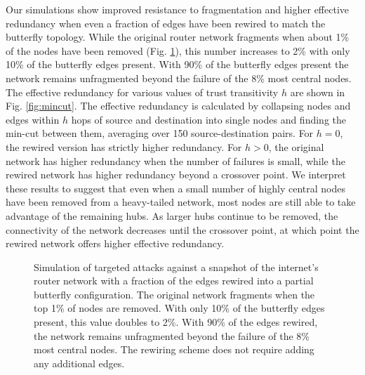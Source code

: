 \documentclass[10pt,letterpaper]{article}
\begin{document}
Our simulations show improved resistance to fragmentation and higher
effective redundancy when even a fraction of edges have been rewired to
match the butterfly topology.
While the original router network fragments when about 1\% of the nodes
have been removed (Fig. \ref{fig:diameter}),
this number increases to 2\%
with only 10\% of the butterfly edges present.
With 90\% of the butterfly edges present
the network remains unfragmented beyond the failure of the 8\% most
central nodes.
The effective redundancy for various values of trust transitivity $h$
are shown in Fig. \ref{fig:mincut}.
The effective redundancy is calculated by collapsing nodes and edges within
$h$ hops of source and destination into single nodes and finding the min-cut
between them,
averaging over 150 source-destination pairs.
For $h=0$, the rewired version has strictly higher redundancy.
For $h>0$,
the original network has higher redundancy when the number of failures is small,
while the rewired network has higher redundancy beyond a crossover point.
We interpret these results to suggest that even when a small number of
highly central nodes have been removed from a heavy-tailed network,
most nodes are still able to take advantage of the remaining hubs.
As larger hubs continue to be removed, the connectivity of the network
decreases until the crossover point,
at which point the rewired network offers higher effective redundancy.

\begin{figure}
\caption{
Simulation of targeted attacks against a snapshot of the internet's router
network with a fraction of the edges rewired into a partial butterfly configuration.
The original network fragments when the top 1\% of nodes are removed.
With only 10\% of the butterfly edges present,
this value doubles to 2\%.
With 90\% of the edges rewired,
the network remains unfragmented beyond the failure of the 8\% most
central nodes.
The rewiring scheme does not require adding any additional edges.
}
\label{fig:diameter}
\end{figure}

\begin{figure*}[h!]
\caption{
Simulation of targeted attacks against a snapshot of the internet's router
network with a fraction of the edges rewired into a partial butterfly configuration.
The effective redundancy is shown for several values of trust transitivity $h$.
For $h>0$, the original network has higher effective redundancy up to a crossover point,
after which the rewired network performs better.
}
\label{fig:mincut}
\end{figure*}
\end{document}
